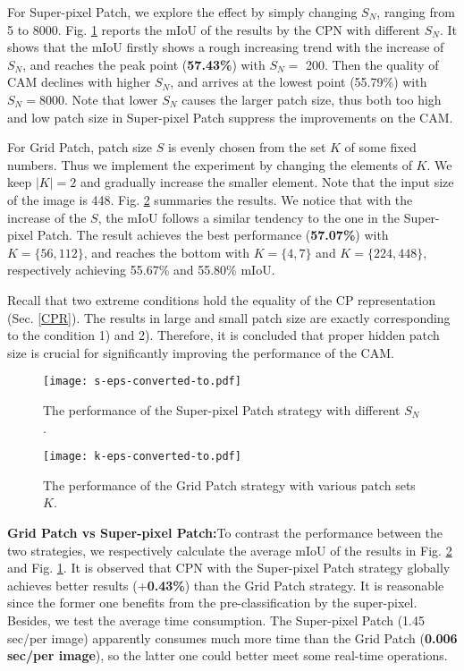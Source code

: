 \documentclass[10pt,twocolumn,letterpaper]{article}
\begin{document}
For Super-pixel Patch, we explore the effect by simply changing $S_N$, ranging from 5 to 8000. Fig. \ref{tab:ablation on ss} reports the mIoU of the results by the CPN with different $S_N$. It shows that the mIoU firstly shows a rough increasing trend with the increase of $S_N$, and reaches the peak point (\textbf{57.43\%}) with $S_N=$ 200. Then the quality of CAM declines with higher $S_N$, and arrives at the lowest point (55.79\%) with $S_N=8000$. Note that lower $S_N$ causes the larger patch size, thus both too high and low patch size in Super-pixel Patch suppress the improvements on the CAM.

For Grid Patch, patch size $S$ is evenly chosen from the set $K$ of some fixed numbers. Thus we implement the experiment by changing the elements of $K$. We keep $|K| = 2$ and gradually increase the smaller element. Note that the input size of the image is 448. Fig. \ref{tab:ablation on sp} summaries the results. We notice that with the increase of the $S$, the mIoU follows a similar tendency to the one in the Super-pixel Patch. The result achieves the best performance (\textbf{57.07\%}) with $K = \{56,112\}$, and reaches the bottom with $K = \{4,7\}$ and $K = \{224,448\}$, respectively achieving 55.67\% and 55.80\% mIoU.

Recall that two extreme conditions hold the equality of the CP representation (Sec. \ref{CPR}). The results in large and small patch size are exactly corresponding to the condition 1) and 2). Therefore, it is concluded that proper hidden patch size is crucial for significantly improving the performance of the CAM.
\begin{figure}
\begin{center}
\texttt{[image: s-eps-converted-to.pdf]}
\end{center}
\vspace{-4mm}
   \caption{The performance of the Super-pixel Patch strategy with different $S_N$.}
\label{tab:ablation on ss}
\end{figure}
\begin{figure}
\begin{center}
\texttt{[image: k-eps-converted-to.pdf]}
\end{center}
   \caption{The performance of the Grid Patch strategy with various patch sets $K$.}
\label{tab:ablation on sp}
\vspace{-2mm}
\end{figure}

\noindent\textbf{Grid Patch vs Super-pixel Patch:}\;To contrast the performance between the two strategies, we respectively calculate the average mIoU of the results in Fig. \ref{tab:ablation on sp} and Fig. \ref{tab:ablation on ss}. It is observed that CPN with the Super-pixel Patch strategy globally achieves better results (+\textbf{0.43\%}) than the Grid Patch strategy. It is reasonable since the former one benefits from the pre-classification by the super-pixel. Besides, we test the average time consumption. The Super-pixel Patch (1.45 sec/per image) apparently consumes much more time than the Grid Patch (\textbf{0.006 sec/per image}), so the latter one could better meet some real-time operations.
\end{document}
